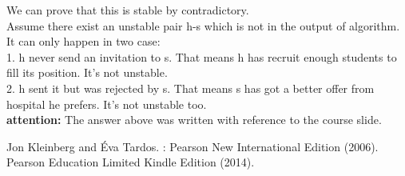 We can prove that this is stable by contradictory. \\
Assume there exist an unstable pair h-s which is not in the output of algorithm. It can only happen in two case: \\
1. h never send an invitation to s. That means h has recruit enough students to fill its position. It's not unstable. \\
2. h sent it but was rejected by s. That means s has got a better offer from hospital he prefers. It's not unstable too. \\

{\bf attention:} The answer above was written with reference to the course slide.
\begin{thebibliography}{11}

    Jon Kleinberg and Éva Tardos.
    : Pearson New International Edition (2006).
    \newblock Pearson Education Limited Kindle Edition (2014). 
    
\end{thebibliography}



